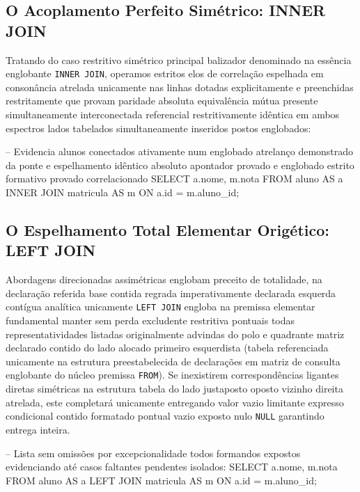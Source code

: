 \subsection{O Acoplamento Perfeito Simétrico: INNER JOIN}
Tratando do caso restritivo simétrico principal balizador denominado na essência englobante \texttt{INNER JOIN}, operamos estritos elos de correlação espelhada em consonância atrelada unicamente nas linhas dotadas explicitamente e preenchidas restritamente que provam paridade absoluta equivalência mútua presente simultaneamente interconectada referencial restritivamente idêntica em ambos espectros lados tabelados simultaneamente inseridos postos englobados:

\begin{sqlcode}
-- Evidencia alunos conectados ativamente num englobado atrelanço demonstrado da ponte e espelhamento idêntico absoluto apontador provado e englobado estrito formativo provado correlacionado
SELECT a.nome, m.nota
FROM aluno AS a
INNER JOIN matricula AS m ON a.id = m.aluno_id;
\end{sqlcode}

\subsection{O Espelhamento Total Elementar Origético: LEFT JOIN}
Abordagens direcionadas assimétricas englobam preceito de totalidade, na declaração referida base contida regrada imperativamente declarada esquerda contígua analítica unicamente \texttt{LEFT JOIN} engloba na premissa elementar fundamental manter sem perda excludente restritiva pontuais todas representatividades listadas originalmente advindas do polo e quadrante matriz declarado contido do lado alocado primeiro esquerdista (tabela referenciada unicamente na estrutura preestabelecida de declarações em matriz de consulta englobante do núcleo premissa \texttt{FROM}). Se inexistirem correspondências ligantes diretas simétricas na estrutura tabela do lado justaposto oposto vizinho direita atrelada, este completará unicamente entregando valor vazio limitante expresso condicional contido formatado pontual vazio exposto nulo \texttt{NULL} garantindo entrega inteira.

\begin{sqlcode}
-- Lista sem omissões por excepcionalidade todos formandos expostos evidenciando até casos faltantes pendentes isolados:
SELECT a.nome, m.nota
FROM aluno AS a
LEFT JOIN matricula AS m ON a.id = m.aluno_id;
\end{sqlcode}


